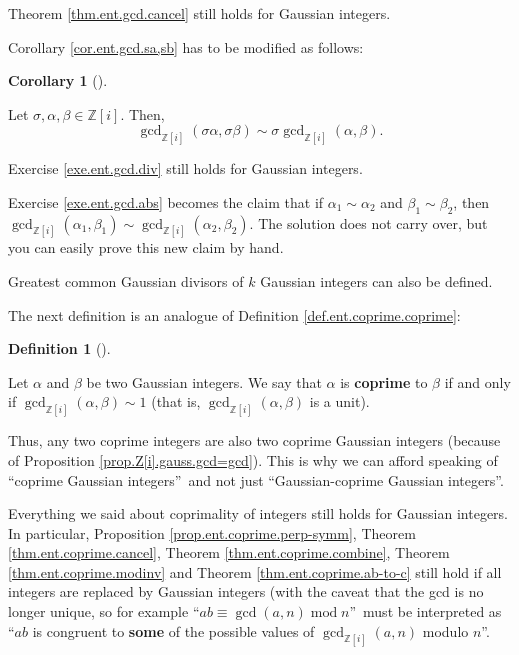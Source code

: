 \documentclass[numbers=enddot,12pt,final,onecolumn,notitlepage]{scrartcl}%
\numberwithin{exer}{subsection}
\theoremstyle{definition}
\newtheorem{defi}[theo]{Definition}
\newenvironment{definition}[1][]
{\begin{defi}[#1]\begin{leftbar}}
{\end{leftbar}\end{defi}}
\newtheorem{coro}[theo]{Corollary}
\newenvironment{corollary}[1][]
{\begin{coro}[#1]\begin{leftbar}}
{\end{leftbar}\end{coro}}
\begin{document}
Theorem \ref{thm.ent.gcd.cancel} still holds for Gaussian integers.

Corollary \ref{cor.ent.gcd.sa,sb} has to be modified as follows:

\begin{corollary}
Let $\sigma,\alpha,\beta\in\mathbb{Z}\left[  i\right]  $. Then,
\[
\gcd\nolimits_{\mathbb{Z}\left[  i\right]  }\left(  \sigma\alpha,\sigma
\beta\right)  \sim\sigma\gcd\nolimits_{\mathbb{Z}\left[  i\right]  }\left(
\alpha,\beta\right)  .
\]

\end{corollary}

Exercise \ref{exe.ent.gcd.div} still holds for Gaussian integers.

Exercise \ref{exe.ent.gcd.abs} becomes the claim that if $\alpha_{1}\sim
\alpha_{2}$ and $\beta_{1}\sim\beta_{2}$, then $\gcd\nolimits_{\mathbb{Z}%
\left[  i\right]  }\left(  \alpha_{1},\beta_{1}\right)  \sim\gcd
\nolimits_{\mathbb{Z}\left[  i\right]  }\left(  \alpha_{2},\beta_{2}\right)
$. The solution does not carry over, but you can easily prove this new claim
by hand.

Greatest common Gaussian divisors of $k$ Gaussian integers can also be defined.

The next definition is an analogue of Definition \ref{def.ent.coprime.coprime}:

\begin{definition}
\label{def.Z[i].gauss.coprime}Let $\alpha$ and $\beta$ be two Gaussian
integers. We say that $\alpha$ is \textbf{coprime} to $\beta$ if and only if
$\gcd\nolimits_{\mathbb{Z}\left[  i\right]  }\left(  \alpha,\beta\right)
\sim1$ (that is, $\gcd\nolimits_{\mathbb{Z}\left[  i\right]  }\left(
\alpha,\beta\right)  $ is a unit).
\end{definition}

Thus, any two coprime integers are also two coprime Gaussian integers (because
of Proposition \ref{prop.Z[i].gauss.gcd=gcd}). This is why we can afford
speaking of \textquotedblleft coprime Gaussian integers\textquotedblright\ and
not just \textquotedblleft Gaussian-coprime Gaussian
integers\textquotedblright.

Everything we said about coprimality of integers still holds for Gaussian
integers. In particular, Proposition \ref{prop.ent.coprime.perp-symm}, Theorem
\ref{thm.ent.coprime.cancel}, Theorem \ref{thm.ent.coprime.combine}, Theorem
\ref{thm.ent.coprime.modinv} and Theorem \ref{thm.ent.coprime.ab-to-c} still
hold if all integers are replaced by Gaussian integers (with the caveat that
the gcd is no longer unique, so for example \textquotedblleft$ab\equiv
\gcd\left(  a,n\right)  \operatorname{mod}n$\textquotedblright\ must be
interpreted as \textquotedblleft$ab$ is congruent to \textbf{some} of the
possible values of $\gcd\nolimits_{\mathbb{Z}\left[  i\right]  }\left(
a,n\right)  $ modulo $n$\textquotedblright.
\end{document}
